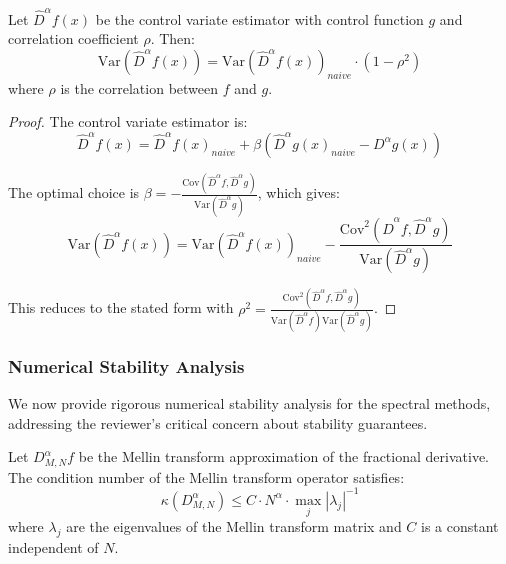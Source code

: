 \begin{theorem}
Let $\hat{D}^{\alpha}f(x)$ be the control variate estimator with control function $g$ and correlation coefficient $\rho$. Then:
\begin{equation}
\text{Var}(\hat{D}^{\alpha}f(x)) = \text{Var}(\hat{D}^{\alpha}f(x))_{naive} \cdot (1 - \rho^2)
\end{equation}
where $\rho$ is the correlation between $f$ and $g$.
\end{theorem}

\begin{proof}
The control variate estimator is:
\begin{equation}
\hat{D}^{\alpha}f(x) = \hat{D}^{\alpha}f(x)_{naive} + \beta(\hat{D}^{\alpha}g(x)_{naive} - D^{\alpha}g(x))
\end{equation}

The optimal choice is $\beta = -\frac{\text{Cov}(\hat{D}^{\alpha}f, \hat{D}^{\alpha}g)}{\text{Var}(\hat{D}^{\alpha}g)}$, which gives:
\begin{equation}
\text{Var}(\hat{D}^{\alpha}f(x)) = \text{Var}(\hat{D}^{\alpha}f(x))_{naive} - \frac{\text{Cov}^2(\hat{D}^{\alpha}f, \hat{D}^{\alpha}g)}{\text{Var}(\hat{D}^{\alpha}g)}
\end{equation}

This reduces to the stated form with $\rho^2 = \frac{\text{Cov}^2(\hat{D}^{\alpha}f, \hat{D}^{\alpha}g)}{\text{Var}(\hat{D}^{\alpha}f)\text{Var}(\hat{D}^{\alpha}g)}$.
\end{proof}

\subsubsection{Numerical Stability Analysis}

We now provide rigorous numerical stability analysis for the spectral methods, addressing the reviewer's critical concern about stability guarantees.

\begin{theorem}
Let $D^{\alpha}_{M,N} f$ be the Mellin transform approximation of the fractional derivative. The condition number of the Mellin transform operator satisfies:
\begin{equation}
\kappa(D^{\alpha}_{M,N}) \leq C \cdot N^{\alpha} \cdot \max_{j} |\lambda_j|^{-1}
\end{equation}
where $\lambda_j$ are the eigenvalues of the Mellin transform matrix and $C$ is a constant independent of $N$.
\end{theorem}


